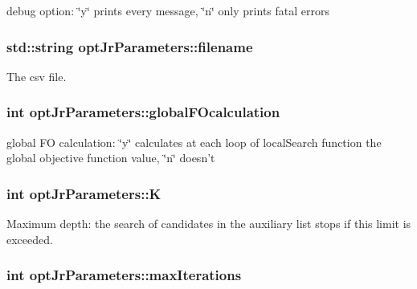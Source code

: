 debug option\-: \char`\"{}y\char`\"{} prints every message, \char`\"{}n\char`\"{} only prints fatal errors 

\hypertarget{classoptJrParameters_a62fe03fe9f9484b54235a0dbe4c09736}{
\subsubsection[{filename}]{\setlength{\rightskip}{0pt plus 5cm}std\-::string opt\-Jr\-Parameters\-::filename\hspace{0.3cm}{\ttfamily [private]}}}\label{classoptJrParameters_a62fe03fe9f9484b54235a0dbe4c09736}


The csv file. 

\hypertarget{classoptJrParameters_ad00a4d00bc8b65f4323a1bd1383c632b}{
\subsubsection[{global\-F\-Ocalculation}]{\setlength{\rightskip}{0pt plus 5cm}int opt\-Jr\-Parameters\-::global\-F\-Ocalculation\hspace{0.3cm}{\ttfamily [private]}}}\label{classoptJrParameters_ad00a4d00bc8b65f4323a1bd1383c632b}


global F\-O calculation\-: \char`\"{}y\char`\"{} calculates at each loop of local\-Search function the global objective function value, \char`\"{}n\char`\"{} doesn't 

\hypertarget{classoptJrParameters_a8943dcfa48e368831ec28c9d1f5a953d}{
\subsubsection[{K}]{\setlength{\rightskip}{0pt plus 5cm}int opt\-Jr\-Parameters\-::\-K\hspace{0.3cm}{\ttfamily [private]}}}\label{classoptJrParameters_a8943dcfa48e368831ec28c9d1f5a953d}


Maximum depth\-: the search of candidates in the auxiliary list stops if this limit is exceeded. 

\hypertarget{classoptJrParameters_af1f1ee05cb0a9962182b9330c7e9536b}{
\subsubsection[{max\-Iterations}]{\setlength{\rightskip}{0pt plus 5cm}int opt\-Jr\-Parameters\-::max\-Iterations\hspace{0.3cm}{\ttfamily [private]}}}\label{classoptJrParameters_af1f1ee05cb0a9962182b9330c7e9536b}


